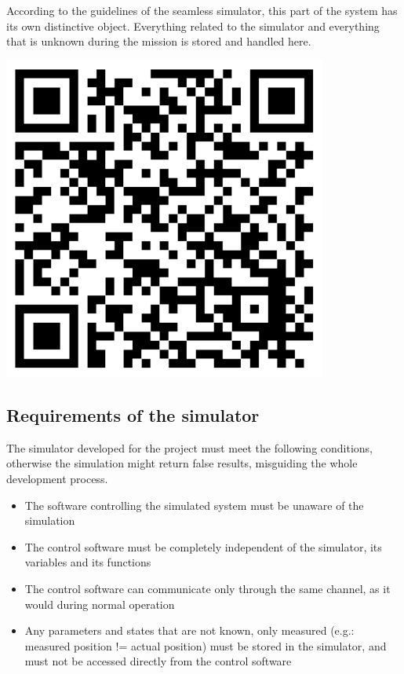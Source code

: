 \begin{tcolorbox}[colback=cyan!5,colframe=cyan!40!black,title=Code: Simulator.py \\ https://www.dropbox.com/s/agron9anslev6xw/Simulator.py]
\begin{minipage}{0,6\textwidth}
According to the guidelines of the seamless simulator, this part of the system has its own distinctive object. Everything related to the simulator and everything that is unknown during the mission is stored and handled here.
\end{minipage}
\begin{minipage}{0,35\textwidth}
\raggedleft
\includegraphics[width=0.8\textwidth]{img/simulatorcode}
\end{minipage}
\end{tcolorbox}

\subsection{Requirements of the simulator}

The simulator developed for the project must meet the following conditions, otherwise the simulation might return false results, misguiding the whole development process.
\begin{itemize}
	\item The software controlling the simulated system must be unaware of the simulation
	\item The control software must be completely independent of the simulator, its variables and its functions
	\item The control software can communicate only through the same channel, as it would during normal operation
	\item Any parameters and states that are not known, only measured (e.g.: measured position != actual position) must be stored in the simulator, and must not be accessed directly from the control software
\end{itemize}

